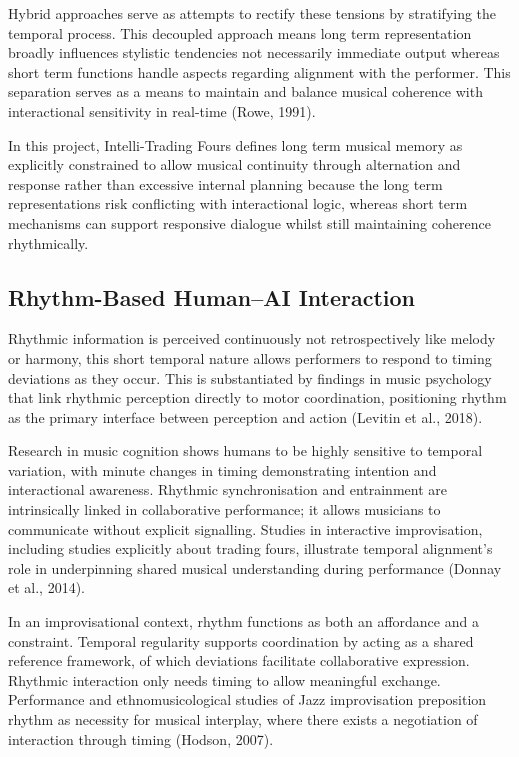 \documentclass[11pt,a4paper]{article}
\begin{document}
Hybrid approaches serve as attempts to rectify these tensions by stratifying the temporal process. This decoupled approach means long term representation broadly influences stylistic tendencies not necessarily immediate output whereas short term functions handle aspects regarding alignment with the performer. This separation serves as a means to maintain and balance musical coherence with interactional sensitivity in real-time (Rowe, 1991). 

In this project, Intelli-Trading Fours defines long term musical memory as explicitly constrained to allow musical continuity through alternation and response rather than excessive internal planning because the long term representations risk conflicting with interactional logic, whereas short term mechanisms can support responsive dialogue whilst still maintaining coherence rhythmically. 

\subsection{Rhythm-Based Human--AI Interaction}
Rhythmic information is perceived continuously not retrospectively like melody or harmony, this short temporal nature allows performers to respond to timing deviations as they occur. This is substantiated by findings in music psychology that link rhythmic perception directly to motor coordination, positioning rhythm as the primary interface between perception and action (Levitin et al., 2018). 

Research in music cognition shows humans to be highly sensitive to temporal variation, with minute changes in timing demonstrating intention and interactional awareness. Rhythmic synchronisation and entrainment are intrinsically linked in collaborative performance; it allows musicians to communicate without explicit signalling. Studies in interactive improvisation, including studies explicitly about trading fours, illustrate temporal alignment’s role in underpinning shared musical understanding during performance (Donnay et al., 2014). 

In an improvisational context, rhythm functions as both an affordance and a constraint. Temporal regularity supports coordination by acting as a shared reference framework, of which deviations facilitate collaborative expression. Rhythmic interaction only needs timing to allow meaningful exchange. Performance and ethnomusicological studies of Jazz improvisation preposition rhythm as necessity for musical interplay, where there exists a negotiation of interaction through timing (Hodson, 2007).
\end{document}
